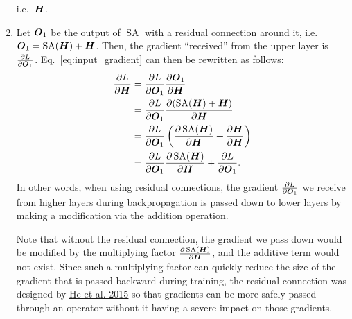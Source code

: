 \documentclass[11pt,a4paper]{article}
\newcommand\op[1]{\operatorname{#1}}
\begin{document}
\begin{enumerate}[label=(\alph*)]
          i.e.\ ${\boldsymbol{H}}$.
    \item Let ${\boldsymbol{O}}_1$ be the output of $\op{SA}$ with a residual connection
          around it, i.e.\ $\mO_1 = \op{SA}(\mH) + \mH$.
          Then, the gradient ``received'' from the upper layer is
          $\frac{\partial L}{\partial {\boldsymbol{O}}_1}$.
          Eq.~\ref{eq:input_gradient} can then be rewritten as follows:
          \begin{align*}
              \frac{\partial L}{\partial \mH} & = \frac{\partial L}{\partial \mO_1}\frac{\partial \mO_1}{\partial \mH}                                                         \\
                                              & = \frac{\partial L}{\partial \mO_1}\frac{\partial (\op{SA}(\mH) + \mH)}{\partial \mH}                                          \\
                                              & = \frac{\partial L}{\partial \mO_1}\left(\frac{\partial \op{SA}(\mH)}{\partial \mH} + \frac{\partial \mH}{\partial \mH}\right) \\
                                              & = \frac{\partial L}{\partial \mO_1}\frac{\partial \op{SA}(\mH)}{\partial \mH} + \frac{\partial L}{\partial \mO_1}.
          \end{align*}
          In other words, when using residual connections, the gradient
          $\frac{\partial L}{\partial {\boldsymbol{O}}_1}$ we receive from higher layers
          during backpropagation is passed down to lower layers by making a
          modification via the addition operation.

          Note that without the residual connection, the gradient we pass down
          would be modified by the multiplying factor
          $\frac{\partial \op{SA}(\mH)}{\partial \mH}$, and the additive term
          would not exist.
          Since such a multiplying factor can quickly reduce the size of the
          gradient that is passed backward during training, the residual
          connection was designed by
          \href{https://arxiv.org/abs/1512.03385}{\underline{He et al. 2015}} so
          that gradients can be more safely passed through an operator without
          it having a severe impact on those gradients.


\end{enumerate}
\end{document}
